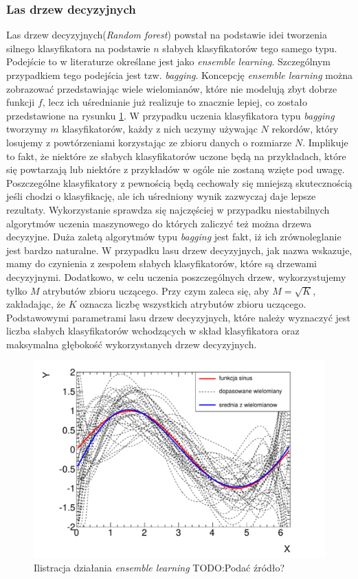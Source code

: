 \subsubsection{Las drzew decyzyjnych}
Las drzew decyzyjnych(\textit{Random forest}) powstał na podstawie idei tworzenia silnego klasyfikatora na podstawie $n$ słabych klasyfikatorów tego samego typu. Podejście to w literaturze określane jest jako \textit{ensemble learning}. Szczególnym przypadkiem tego podejścia jest tzw. \textit{bagging}\cite{gonczarek}. Koncepcję \textit{ensemble learning} można zobrazować przedstawiając wiele wielomianów, które nie modelują zbyt dobrze funkcji $f$, lecz ich uśrednianie już realizuje to znacznie lepiej, co zostało przedstawione na rysunku \ref{avg1}.  W przypadku uczenia klasyfikatora typu \textit{bagging} tworzymy $m$ klasyfikatorów, każdy z nich uczymy używając $N$ rekordów, który losujemy z powtórzeniami korzystając ze zbioru danych o rozmiarze $N$. Implikuje to fakt, że niektóre ze słabych klasyfikatorów uczone będą na przykładach, które się powtarzają lub niektóre z przykładów w ogóle nie zostaną wzięte pod uwagę. Poszczególne klasyfikatory z pewnością będą cechowały się mniejszą skutecznością jeśli chodzi o klasyfikację, ale ich uśredniony wynik zazwyczaj daje lepsze rezultaty. Wykorzystanie sprawdza się najczęściej w przypadku niestabilnych algorytmów uczenia maszynowego do których zaliczyć też można drzewa decyzyjne\cite{ensemble}. Duża zaletą algorytmów typu \textit{bagging} jest fakt, iż ich zrównoleglanie jest bardzo naturalne.
W przypadku lasu drzew decyzyjnych, jak nazwa wskazuje, mamy do czynienia z zespołem słabych klasyfikatorów, które są drzewami decyzyjnymi. Dodatkowo, w celu uczenia poszczególnych drzew, wykorzystujemy tylko $M$ atrybutów zbioru uczącego. Przy czym zaleca się, aby $M=\sqrt{K}$, zakładając, że $K$ oznacza liczbę wszystkich atrybutów zbioru uczącego. Podstawowymi parametrami lasu drzew decyzyjnych, które należy wyznaczyć jest liczba słabych klasyfikatorów wchodzących w skład klasyfikatora oraz maksymalna głębokość wykorzystanych drzew decyzyjnych.
\begin{figure}[ht!]
\centering
\includegraphics[scale=0.7]{res/avg1.png}
\caption[Caption for LOF]{Ilistracja działania \textit{ensemble learning} TODO:Podać źródło?\label{avg1}}
\end{figure} 

